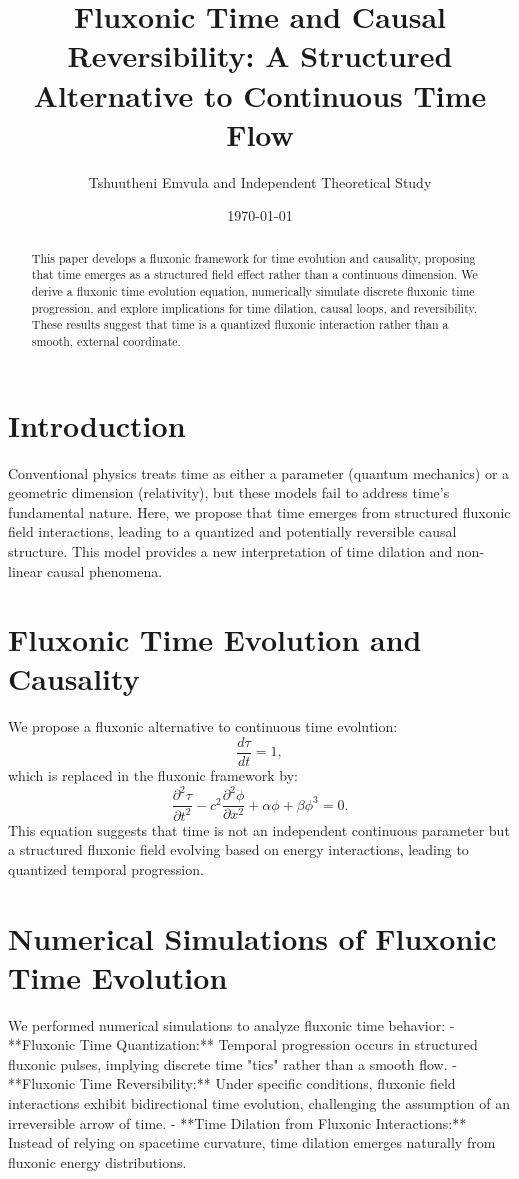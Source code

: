 \documentclass{article}
\title{Fluxonic Time and Causal Reversibility: A Structured Alternative to Continuous Time Flow}
\author{Tshuutheni Emvula and Independent Theoretical Study}
\date{\today}
\begin{document}
\maketitle

\begin{abstract}
This paper develops a fluxonic framework for time evolution and causality, proposing that time emerges as a structured field effect rather than a continuous dimension. We derive a fluxonic time evolution equation, numerically simulate discrete fluxonic time progression, and explore implications for time dilation, causal loops, and reversibility. These results suggest that time is a quantized fluxonic interaction rather than a smooth, external coordinate.
\end{abstract}

\section{Introduction}
Conventional physics treats time as either a parameter (quantum mechanics) or a geometric dimension (relativity), but these models fail to address time's fundamental nature. Here, we propose that time emerges from structured fluxonic field interactions, leading to a quantized and potentially reversible causal structure. This model provides a new interpretation of time dilation and non-linear causal phenomena.

\section{Fluxonic Time Evolution and Causality}
We propose a fluxonic alternative to continuous time evolution:
\begin{equation}
    \frac{d \tau}{d t} = 1,
\end{equation}
which is replaced in the fluxonic framework by:
\begin{equation}
    \frac{\partial^2 \tau}{\partial t^2} - c^2 \frac{\partial^2 \phi}{\partial x^2} + \alpha \phi + \beta \phi^3 = 0.
\end{equation}
This equation suggests that time is not an independent continuous parameter but a structured fluxonic field evolving based on energy interactions, leading to quantized temporal progression.

\section{Numerical Simulations of Fluxonic Time Evolution}
We performed numerical simulations to analyze fluxonic time behavior:
- **Fluxonic Time Quantization:** Temporal progression occurs in structured fluxonic pulses, implying discrete time "tics" rather than a smooth flow.
- **Fluxonic Time Reversibility:** Under specific conditions, fluxonic field interactions exhibit bidirectional time evolution, challenging the assumption of an irreversible arrow of time.
- **Time Dilation from Fluxonic Interactions:** Instead of relying on spacetime curvature, time dilation emerges naturally from fluxonic energy distributions.
\end{document}
